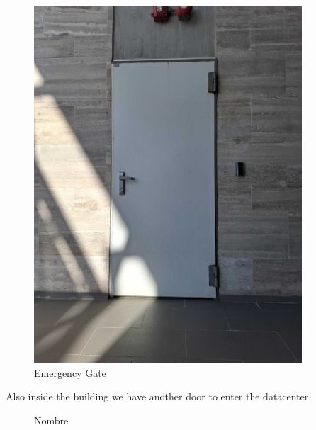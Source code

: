   \newpage

  \begin{figure}
    \includegraphics[width=10cm]{17.jpg}
    \centering
    \caption*{Emergency Gate}
  \end{figure}

  \newpage

Also inside the building we have another door to enter the datacenter.

\begin{figure}
    \centering
    \caption*{Nombre}
  \end{figure}

